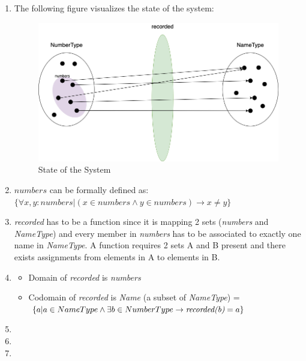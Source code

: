 \begin{enumerate}
    \item The following figure visualizes the state of the system:
        \begin{figure}[h]
        \centering
        \includegraphics[scale=0.45]{images/Diagram.png}
        \caption{State of the System}
        \label{fig:Diagram}
        \end{figure}
    \item $numbers$ can be formally defined as: \\
    $\{ \forall x, y: numbers | (x \in numbers \wedge y \in numbers) \rightarrow x \neq y \}$
\item \emph{recorded} has to be a function since it is mapping 2 sets (\emph{numbers} and \emph{NameType}) and every member in \emph{numbers} has to be associated to exactly one name in \emph{NameType}. A function requires 2 sets A and B present and there exists assignments from elements in A to elements in B.
\item 
    \begin{itemize}
        \item[] Domain of \emph{recorded} is \emph{numbers}
        \item[] Codomain of \emph{recorded} is \emph{Name} (a subset of \emph{NameType}) = $\{a | a \in NameType \wedge \exists b \in NumberType \rightarrow \text{\emph{recorded(b)}} = a \}$
    \end{itemize}
    \item
    \item
    \item
\end{enumerate}
